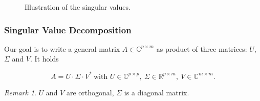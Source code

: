 \documentclass[a4paper,12 pt]{article}
\numberwithin{equation}{section}
\theoremstyle{definition}
\theoremstyle{remark}
\newtheorem*{bmk}{Remark}
\theoremstyle{definition}
\theoremstyle{definition}
\theoremstyle{definition}
\theoremstyle{remark}
\begin{document}
\begin{figure}[ht]
\begin{center}
\end{center}
\caption{Illustration of the singular values.}
\end{figure}

\subsubsection{Singular Value Decomposition}

Our goal is to write a general matrix  $A \in \mathbb{C}^{p \times m}$ as product of three matrices: $U$, $\Sigma $ and $V$. It holds

\begin{equation}
A=U\cdot \Sigma \cdot V^* \ \text{with } U \in \mathbb{C}^{p\times p},\ \Sigma \in \mathbb{R}^{p\times m},\ V\in \mathbb{C}^{m\times m}.
\end{equation}

\begin{bmk}
$U$ and $V$ are orthogonal, $\Sigma $ is a diagonal matrix.
\end{bmk}
\newpage
\end{document}
